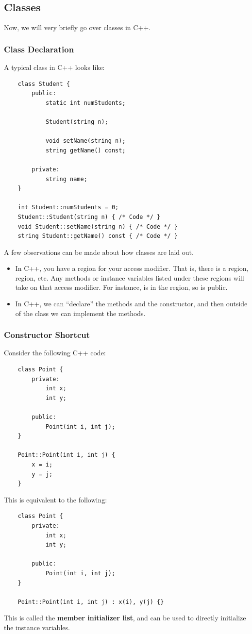 \documentclass[letterpaper]{article}
\begin{document}
\subsection{Classes}
Now, we will very briefly go over classes in C++. 

\subsubsection{Class Declaration}
A typical class in C++ looks like: 
\begin{verbatim}
    class Student {
        public: 
            static int numStudents; 

            Student(string n);
            
            void setName(string n);
            string getName() const; 

        private: 
            string name; 
    }

    int Student::numStudents = 0;
    Student::Student(string n) { /* Code */ }
    void Student::setName(string n) { /* Code */ }
    string Student::getName() const { /* Code */ }
\end{verbatim}
A few observations can be made about how classes are laid out. 
\begin{itemize}
    \item In C++, you have a region for your access modifier. That is, there is a  region,  region, etc. Any methods or instance variables listed under these regions will take on that access modifier. For instance,  is in the  region, so  is public.
    \item In C++, we can ``declare'' the methods and the constructor, and then outside of the class we can implement the methods.
\end{itemize}

\subsubsection{Constructor Shortcut}
Consider the following C++ code:
\begin{verbatim}
    class Point {
        private: 
            int x; 
            int y;
        
        public:
            Point(int i, int j);
    }

    Point::Point(int i, int j) {
        x = i;
        y = j;
    }
\end{verbatim}
This is equivalent to the following: 
\begin{verbatim}
    class Point {
        private: 
            int x; 
            int y;
        
        public:
            Point(int i, int j);
    }

    Point::Point(int i, int j) : x(i), y(j) {}
\end{verbatim}
This is called the \textbf{member initializer list}, and can be used to directly initialize the instance variables. 
\end{document}
